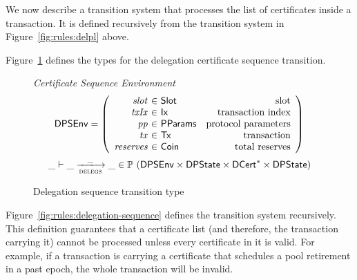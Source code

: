 We now describe a transition system that processes the list of certificates inside a transaction.
It is defined recursively from the transition system in Figure~\ref{fig:rules:delpl} above.

Figure~\ref{fig:type:delegations} defines the types for the delegation certificate sequence
transition.

\begin{figure}[hbt]
  \emph{Certificate Sequence Environment}
  \begin{equation*}
    \DPSEnv =
    \left(
      \begin{array}{r@{~\in~}lr}
        \var{slot} & \Slot & \text{slot}\\
        \var{txIx} & \Ix & \text{transaction index}\\
        \var{pp} & \PParams & \text{protocol parameters}\\
        \var{tx} & \Tx & \text{transaction} \\
        \var{reserves} & \Coin & \text{total reserves}
      \end{array}
    \right)
  \end{equation*}
  \begin{equation*}
    \_ \vdash \_ \trans{delegs}{\_} \_ \in
    \powerset (
    \DPSEnv \times \DPState \times \seqof{\DCert} \times \DPState)
  \end{equation*}
  \caption{Delegation sequence transition type}
  \label{fig:type:delegations}
\end{figure}

Figure~\ref{fig:rules:delegation-sequence} defines the transition system recursively.
This definition guarantees that a certificate list (and therefore, the transaction carrying it)
cannot be processed unless every certificate in it is valid. For example, if a transaction is
carrying a certificate that schedules a pool retirement in a past epoch, the whole transaction
will be invalid.

